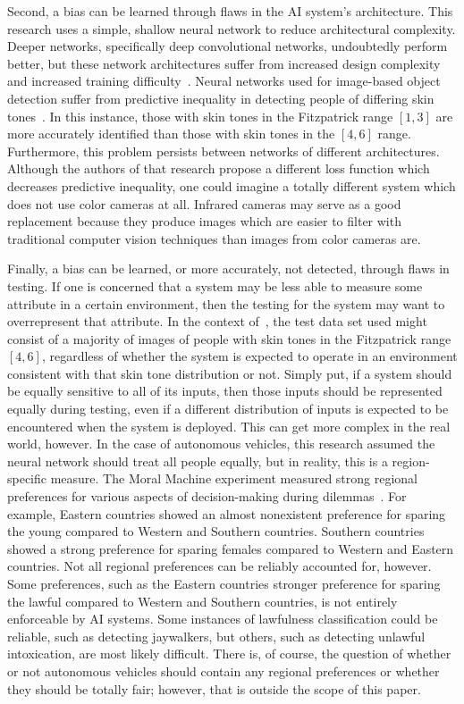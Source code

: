 \documentclass[paper=a4paper]{report}
\begin{document}
Second, a bias can be learned through flaws in the AI system's architecture. This research uses a
simple, shallow neural network to reduce architectural complexity. Deeper networks, specifically
deep convolutional networks, undoubtedly perform better, but these network architectures suffer from
increased design complexity and increased training difficulty~\cite{mhaskar2016deep}. Neural
networks used for image-based object detection suffer from predictive inequality in detecting people
of differing skin tones~\cite{wilson2019predictive}. In this instance, those with skin tones in the
Fitzpatrick range $[1, 3]$ are more accurately identified than those with skin tones in the $[4, 6]$
range. Furthermore, this problem persists between networks of different architectures. Although the
authors of that research propose a different loss function which decreases predictive inequality,
one could imagine a totally different system which does not use color cameras at all. Infrared
cameras may serve as a good replacement because they produce images which are easier to filter with
traditional computer vision techniques than images from color cameras are.

Finally, a bias can be learned, or more accurately, not detected, through flaws in testing. If one
is concerned that a system may be less able to measure some attribute in a certain environment, then
the testing for the system may want to overrepresent that attribute. In the context
of~\cite{wilson2019predictive}, the test data set used might consist of a majority of images of
people with skin tones in the Fitzpatrick range $[4, 6]$, regardless of whether the system is
expected to operate in an environment consistent with that skin tone distribution or not. Simply
put, if a system should be equally sensitive to all of its inputs, then those inputs should be
represented equally during testing, even if a different distribution of inputs is expected to be
encountered when the system is deployed. This can get more complex in the real world, however. In
the case of autonomous vehicles, this research assumed the neural network should treat all people
equally, but in reality, this is a region-specific measure. The Moral Machine experiment measured
strong regional preferences for various aspects of decision-making during
dilemmas~\cite{awad2018moral}. For example, Eastern countries showed an almost nonexistent
preference for sparing the young compared to Western and Southern countries. Southern countries
showed a strong preference for sparing females compared to Western and Eastern countries. Not all
regional preferences can be reliably accounted for, however. Some preferences, such as the Eastern
countries stronger preference for sparing the lawful compared to Western and Southern countries, is
not entirely enforceable by AI systems. Some instances of lawfulness classification could be
reliable, such as detecting jaywalkers, but others, such as detecting unlawful intoxication, are
most likely difficult. There is, of course, the question of whether or not autonomous vehicles
should contain any regional preferences or whether they should be totally fair; however, that is
outside the scope of this paper.
\end{document}
